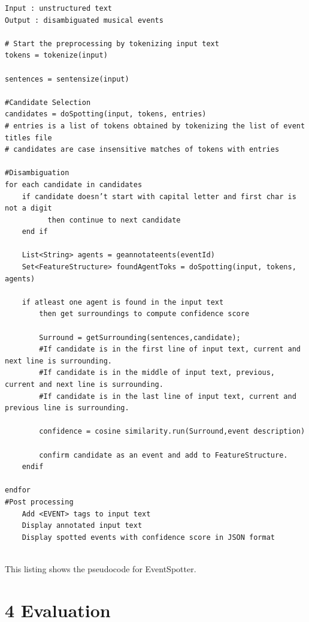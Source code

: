 \documentclass[a4paper,11pt]{report}
\begin{document}
\begin{lstlisting}
Input : unstructured text 
Output : disambiguated musical events

# Start the preprocessing by tokenizing input text
tokens = tokenize(input)

sentences = sentensize(input)

#Candidate Selection
candidates = doSpotting(input, tokens, entries)
# entries is a list of tokens obtained by tokenizing the list of event titles file
# candidates are case insensitive matches of tokens with entries

#Disambiguation
for each candidate in candidates
	if candidate doesn’t start with capital letter and first char is not a digit
          then continue to next candidate
	end if

    List<String> agents = geannotateents(eventId)
	Set<FeatureStructure> foundAgentToks = doSpotting(input, tokens, agents)	
	
	if atleast one agent is found in the input text  
		then get surroundings to compute confidence score
			
		Surround = getSurrounding(sentences,candidate);
		#If candidate is in the first line of input text, current and next line is surrounding.
		#If candidate is in the middle of input text, previous, current and next line is surrounding.
		#If candidate is in the last line of input text, current and previous line is surrounding.
	
		confidence = cosine similarity.run(Surround,event description)
	 
		confirm candidate as an event and add to FeatureStructure.
	endif
	
endfor
#Post processing
	Add <EVENT> tags to input text 
	Display annotated input text 
	Display spotted events with confidence score in JSON format
	

\end{lstlisting}
This listing shows the pseudocode for EventSpotter.


\chapter*{4 Evaluation}
\end{document}
